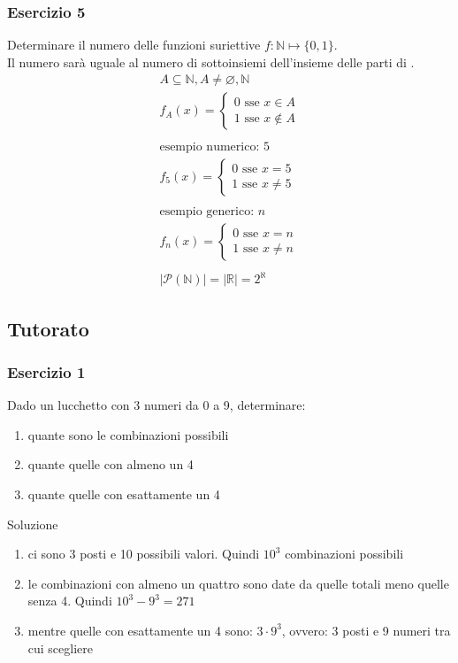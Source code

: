 \documentclass[italian]{article}
\newcommand{\ins}[1]{\text{$\mathbb{#1}$}}
\begin{document}
\subsubsection{Esercizio 5}
Determinare il numero delle funzioni suriettive $f: \ins{N} \longmapsto \{0,1\}$.\\[2mm]
Il numero sarà uguale al numero di sottoinsiemi dell'insieme delle parti di \ins{N}.
\begin{gather*}
	A \subseteq \ins{N}, A \neq \varnothing,\ins{N}\\
	f_A(x)=
	\begin{cases*}
		0 \text{ sse } x\in A\\
		1 \text{ sse } x\notin A
	\end{cases*}\\\\
	\text{esempio numerico: } 5\\
	f_5(x) =
	\begin{cases*}
		0 \text{ sse } x=5\\
		1 \text{ sse } x\neq 5
	\end{cases*}\\\\
	\text{esempio generico: } n\\
	f_n(x) =
	\begin{cases*}
	0 \text{ sse } x=n\\
	1 \text{ sse } x\neq n
	\end{cases*}\\\\
	|\mathcal{P}(\ins{N})| = |\ins{R}| = 2^{\aleph}
\end{gather*}

\subsection{Tutorato}
\subsubsection{Esercizio 1}
Dado un lucchetto con 3 numeri da 0 a 9, determinare:
\begin{enumerate}[label=\alph*)]
	\item quante sono le combinazioni possibili
	\item quante quelle con almeno un 4
	\item quante quelle con esattamente un 4
\end{enumerate}
Soluzione
\begin{enumerate}[label=\alph*)]
	\item ci sono 3 posti e 10 possibili valori. Quindi $ 10^3 $ combinazioni possibili
	\item le combinazioni con almeno un quattro sono date da quelle totali meno quelle senza 4. Quindi $10^3 - 9^3 = 271$
	\item mentre quelle con esattamente un 4 sono: $3\cdot9^3$, ovvero: 3 posti e 9 numeri tra cui scegliere
\end{enumerate}
\end{document}
